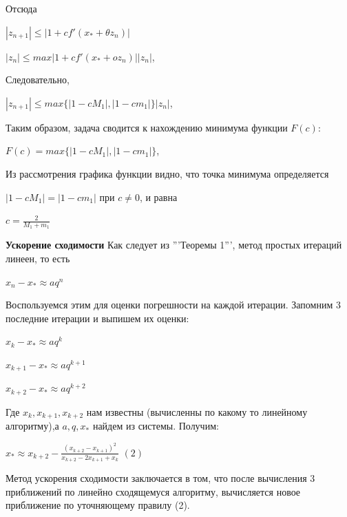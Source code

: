 \documentclass{article}
\begin{document}
				Отсюда
				 
				\begin{center}$|z_{n+1}|\le|1+cf'(x_*+{\theta}z_n)|$
				
				$|z_n|\le max|1+cf'(x_*+oz_n)||z_n|$,\end{center}
				
				Следовательно,
				 
				\begin{center}$|z_{n+1}|\le max\{|1-cM_1|,|1-cm_1|\}|z_n|$,\end{center}
				
				
				Таким образом, задача сводится к нахождению минимума функции $F(c):$


				\begin{center}$F(c) = max\{|1-cM_1|,|1-cm_1|\}$,\end{center}


				Из рассмотрения графика функции видно, что точка минимума определяется 
				
				$|1-cM_1| = |1-cm_1|$ при $c\ne 0 $,
и равна 

				\begin{center}$c = \frac{2}{M_1+m_1}$\end{center}
				 
				\textbf{Ускорение сходимости}
				Как следует из '''Теоремы 1''', метод простых итераций линеен, то есть 
				
				\begin{center}$x_n-x_* \approx aq^n$ \end{center}
				
				Воспользуемся этим для оценки погрешности на каждой итерации. Запомним 3 последние итерации и выпишем их оценки:
				
				\begin{center}$ x_{k}-x_{*} \approx aq^{k}$ 

				$ x_{k+1}-x_{*} \approx aq^{k+1}$ 

				$ x_{k+2}-x_{*} \approx aq^{k+2}$ \end{center}

				Где $ x_{k},x_{k+1},x_{k+2}$ нам известны (вычисленны по какому то линейному алгоритму),а $a,q,x_*$ найдем из системы. Получим:
				
				\begin{center}$ x_{*} \approx x_{k+2} - \frac{(x_{k+2}-x_{k+1})^2}{x_{k+2}-2x_{k+1}+x_{k}}$      $(2)$\end{center}
				
				Метод ускорения сходимости заключается в том, что после вычисления 3 приближений по линейно сходящемуся алгоритму, вычисляется новое приближение по уточняющему правилу (2).
				
\end{document}
